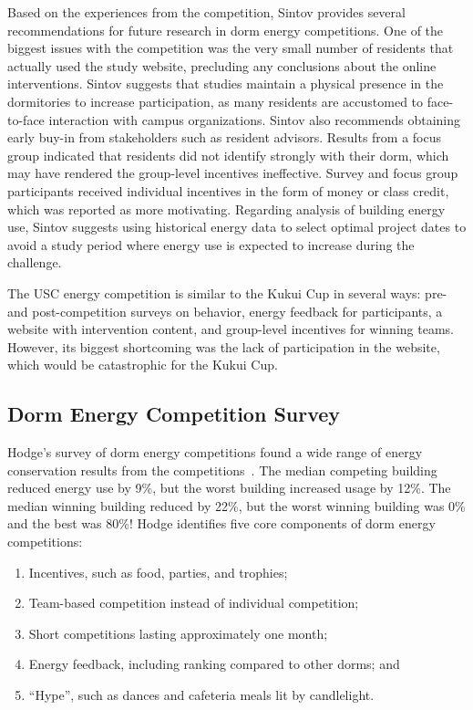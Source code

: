 Based on the experiences from the competition, Sintov provides several recommendations for future research in dorm energy competitions. One of the biggest issues with the competition was the very small number of residents that actually used the study website, precluding any conclusions about the online interventions. Sintov suggests that studies maintain a physical presence in the dormitories to increase participation, as many residents are accustomed to face-to-face interaction with campus organizations. Sintov also recommends obtaining early buy-in from stakeholders such as resident advisors. Results from a focus group indicated that residents did not identify strongly with their dorm, which may have rendered the group-level incentives ineffective. Survey and focus group participants received individual incentives in the form of money or class credit, which was reported as more motivating. Regarding analysis of building energy use, Sintov suggests using historical energy data to select optimal project dates to avoid a study period where energy use is expected to increase during the challenge.

The USC energy competition is similar to the Kukui Cup in several ways: pre- and post-competition surveys on behavior, energy feedback for participants, a website with intervention content, and group-level incentives for winning teams. However, its biggest shortcoming was the lack of participation in the website, which would be catastrophic for the Kukui Cup.


\subsection{Dorm Energy Competition Survey}

Hodge's survey of dorm energy competitions found a wide range of energy conservation results from the competitions~\cite{Hodge2010}. The median competing building reduced energy use by 9\%, but the worst building increased usage by 12\%. The median winning building reduced by 22\%, but the worst winning building was 0\% and the best was 80\%! Hodge identifies five core components of dorm energy competitions:

\begin{enumerate}
	\item Incentives, such as food, parties, and trophies;
	\item Team-based competition instead of individual competition;
	\item Short competitions lasting approximately one month;
	\item Energy feedback, including ranking compared to other dorms; and
	\item ``Hype'', such as dances and cafeteria meals lit by candlelight.
\end{enumerate}



